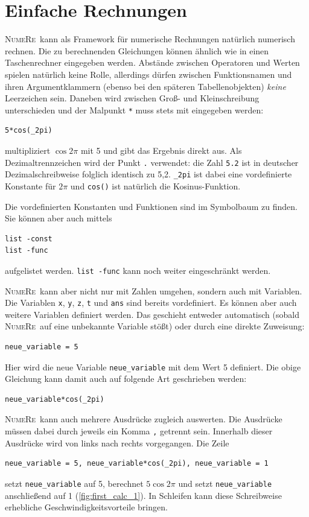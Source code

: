 \documentclass[DIV=14,headsepline,footsepline]{scrbook}
\newcommand{\NR}{\textsc{Nu\-me\-Re}}
\begin{document}
			\section{Einfache Rechnungen}
				\NR\ kann als Framework für numerische Rechnungen natürlich numerisch rechnen. Die zu berechnenden Gleichungen können ähnlich wie in einen Taschenrechner eingegeben werden. Abstände zwischen Operatoren und Werten spielen natürlich keine Rolle, allerdings dürfen zwischen Funktionsnamen und ihren Argumentklammern (ebenso bei den späteren Tabellenobjekten) \emph{keine} Leerzeichen sein. Daneben wird zwischen Groß- und Kleinschreibung unterschieden und der Malpunkt \lstinline+*+ muss stets mit eingegeben werden:
				\begin{lstlisting}
5*cos(_2pi)
				\end{lstlisting}
				multipliziert $\cos2\pi$ mit 5 und gibt das Ergebnis direkt aus. Als Dezimaltrennzeichen wird der Punkt \lstinline+.+ verwendet: die Zahl \lstinline+5.2+ ist in deutscher Dezimalschreibweise folglich identisch zu 5,2. \lstinline+_2pi+ ist dabei eine vordefinierte Konstante für $2\pi$ und \lstinline+cos()+ ist natürlich die Kosinus-Funktion.

				Die vordefinierten Konstanten und Funktionen sind im Symbolbaum zu finden. Sie können aber auch mittels 
				\begin{lstlisting}
list -const
list -func
				\end{lstlisting}
				aufgelistet werden. \lstinline+list -func+ kann noch weiter eingeschränkt werden.
				
				\NR\ kann aber nicht nur mit Zahlen umgehen, sondern auch mit Variablen. Die Variablen \lstinline+x+, \lstinline+y+, \lstinline+z+, \lstinline+t+ und \lstinline+ans+ sind bereits vordefiniert. Es können aber auch weitere Variablen definiert werden. Das geschieht entweder automatisch (sobald \NR\ auf eine unbekannte Variable stößt) oder durch eine direkte Zuweisung:
				\begin{lstlisting}
neue_variable = 5
				\end{lstlisting}
				Hier wird die neue Variable \lstinline+neue_variable+ mit dem Wert 5 definiert. Die obige Gleichung kann damit auch auf folgende Art geschrieben werden:
				\begin{lstlisting}
neue_variable*cos(_2pi)
				\end{lstlisting}
				
				\NR\ kann auch mehrere Ausdrücke zugleich auswerten. Die Ausdrücke müssen dabei durch jeweils ein Komma \lstinline+,+ getrennt sein. Innerhalb dieser Ausdrücke wird von links nach rechts vorgegangen. Die Zeile 
				\begin{lstlisting}
neue_variable = 5, neue_variable*cos(_2pi), neue_variable = 1
				\end{lstlisting}
				setzt \lstinline+neue_variable+ auf 5, berechnet $5\cos2\pi$ und setzt \lstinline+neue_variable+ anschließend auf 1 (\autoref{fig:first_calc_1}). In Schleifen kann diese Schreibweise erhebliche Geschwindigkeitsvorteile bringen.
				
\end{document}
